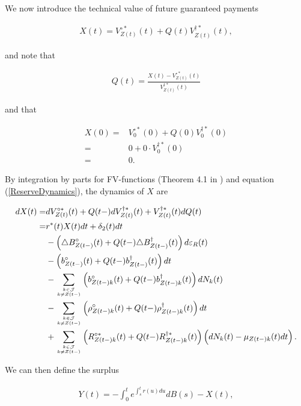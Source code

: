 \documentclass{article}
\newcommand{\1}[1]{\mathbbm{1}_{\left\lbrace #1 \right\rbrace}}
\theoremstyle{break}
\theoremstyle{remark}
\numberwithin{equation}{section}
\begin{document}
We now introduce the technical value of future guaranteed payments

\begin{align} \label{XDef}
X(t) = V_{Z(t)}^{\circ*}(t) + Q(t) V_{Z(t)}^{\dagger*}(t),
\end{align}

and note that 

\begin{align*}
	Q(t) = \frac{X(t) - V_{Z(t)}^{\circ*}(t)}{V_{Z(t)}^{\dagger*}(t)}
\end{align*}

and that

\begin{align*}
X(0) =& V_{0}^{\circ*}(0) + Q(0) V_{0}^{\dagger*}(0) \\
=& 0 + 0 \cdot V_{0}^{\dagger*}(0) \\
=& 0.
\end{align*}

By integration by parts for FV-functions (Theorem 4.1 in \cite{LivStok}) and equation (\ref{ReserveDynamics}), the dynamics of $X$ are

\begin{align} \label{XDynamics}
\begin{split}
dX(t) =& dV_{Z(t)}^{\circ*}(t) + Q(t-) dV_{Z(t)}^{\dagger*}(t) + V_{Z(t)}^{\dagger*}(t) dQ(t) \\
=& r^*(t) X(t) dt + \delta_2(t)dt \\
&- \left( \triangle B_{Z(t-)}^\circ(t) + Q(t-) \triangle B_{Z(t-)}^\dagger(t) \right) d \varepsilon_{R}(t) \\
&- \left( b_{Z(t-)}^\circ(t) + Q(t-) b_{Z(t-)}^\dagger(t) \right) dt \\
&- \sum_{k \in \mathcal{J} \atop k \neq Z(t-)} \left( b_{Z(t-)k}^\circ(t) + Q(t-) b_{Z(t-)k}^\dagger(t)\right) dN_k(t) \\
&- \sum_{k \in \mathcal{J} \atop k \neq Z(t-)} \left( \rho_{Z(t-)k}^\circ(t) + Q(t-) \rho_{Z(t-)k}^\dagger(t) \right) dt \\
&+ \sum_{k \in \mathcal{J} \atop k \neq Z(t-)} \left( R_{Z(t-)k}^{\circ*}(t) + Q(t-) R_{Z(t-)k}^{\dagger*}(t) \right) \left( dN_k(t) - \mu_{Z(t-)k}(t) dt \right).
\end{split}
\end{align}

We can then define the surplus

\begin{align} \label{YDef}
Y(t) = - \int_0^t e^{\int_s^t r(u)du} dB(s) - X(t),
\end{align}
\end{document}
